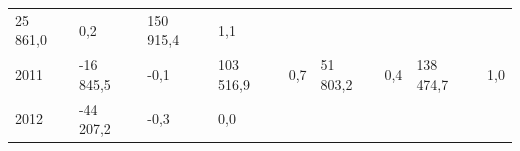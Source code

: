 \begin{longtable}[]{@{}lllllllll@{}}
\begin{minipage}[t]{0.12\columnwidth}
25 861,0\strut
\end{minipage} & \begin{minipage}[t]{0.06\columnwidth}\raggedright
0,2\strut
\end{minipage} & \begin{minipage}[t]{0.08\columnwidth}\raggedright
150 915,4\strut
\end{minipage} & \begin{minipage}[t]{0.06\columnwidth}\raggedright
1,1\strut
\end{minipage}\tabularnewline
\begin{minipage}[t]{0.05\columnwidth}\raggedright
2011\strut
\end{minipage} & \begin{minipage}[t]{0.10\columnwidth}\raggedright
-16 845,5\strut
\end{minipage} & \begin{minipage}[t]{0.06\columnwidth}\raggedright
-0,1\strut
\end{minipage} & \begin{minipage}[t]{0.17\columnwidth}\raggedright
103 516,9\strut
\end{minipage} & \begin{minipage}[t]{0.06\columnwidth}\raggedright
0,7\strut
\end{minipage} & \begin{minipage}[t]{0.12\columnwidth}\raggedright
51 803,2\strut
\end{minipage} & \begin{minipage}[t]{0.06\columnwidth}\raggedright
0,4\strut
\end{minipage} & \begin{minipage}[t]{0.08\columnwidth}\raggedright
138 474,7\strut
\end{minipage} & \begin{minipage}[t]{0.06\columnwidth}\raggedright
1,0\strut
\end{minipage}\tabularnewline
\begin{minipage}[t]{0.05\columnwidth}\raggedright
2012\strut
\end{minipage} & \begin{minipage}[t]{0.10\columnwidth}\raggedright
-44 207,2\strut
\end{minipage} & \begin{minipage}[t]{0.06\columnwidth}\raggedright
-0,3\strut
\end{minipage} & \begin{minipage}[t]{0.17\columnwidth}\raggedright
0,0\strut
\end{minipage} & \begin{minipage}[t]{0.06\columnwidth}\raggedright

\end{minipage}
\end{longtable}
